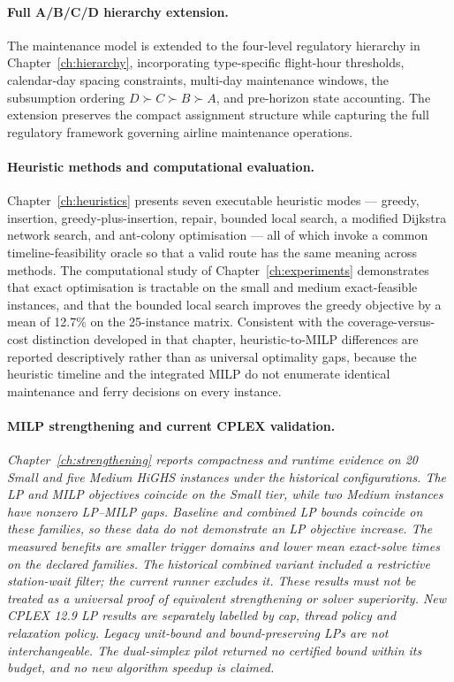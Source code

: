 \paragraph{Full A/B/C/D hierarchy extension.}
The maintenance model is extended to the four-level regulatory hierarchy in Chapter~\ref{ch:hierarchy}, incorporating type-specific flight-hour thresholds, calendar-day spacing constraints, multi-day maintenance windows, the subsumption ordering $D \succ C \succ B \succ A$, and pre-horizon state accounting. The extension preserves the compact assignment structure while capturing the full regulatory framework governing airline maintenance operations.

\paragraph{Heuristic methods and computational evaluation.}
Chapter~\ref{ch:heuristics} presents seven executable heuristic modes --- greedy, insertion, greedy-plus-insertion, repair, bounded local search, a modified Dijkstra network search, and ant-colony optimisation --- all of which invoke a common timeline-feasibility oracle so that a valid route has the same meaning across methods. The computational study of Chapter~\ref{ch:experiments} demonstrates that exact optimisation is tractable on the small and medium exact-feasible instances, and that the bounded local search improves the greedy objective by a mean of 12.7\% on the 25-instance matrix. Consistent with the coverage-versus-cost distinction developed in that chapter, heuristic-to-MILP differences are reported descriptively rather than as universal optimality gaps, because the heuristic timeline and the integrated MILP do not enumerate identical maintenance and ferry decisions on every instance.

\paragraph{MILP strengthening and current CPLEX validation.}
\textit{Chapter~\ref{ch:strengthening} reports compactness and runtime evidence
on 20 Small and five Medium HiGHS instances under the historical configurations.
The LP and MILP objectives coincide on the Small tier, while two Medium
instances have nonzero LP--MILP gaps. Baseline and combined LP bounds coincide
on these families, so these data do not demonstrate an LP objective increase.
The measured benefits are smaller trigger domains and lower mean exact-solve
times on the declared families. The historical combined variant included a
restrictive station-wait filter; the current runner excludes it. These results
must not be treated as a universal proof of equivalent strengthening or solver
superiority. New CPLEX 12.9 LP results are separately labelled by cap, thread
policy and relaxation policy. Legacy unit-bound and bound-preserving LPs are
not interchangeable. The dual-simplex pilot returned no certified bound within
its budget, and no new algorithm speedup is claimed.}


